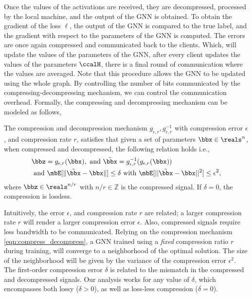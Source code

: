 \documentclass[lettersize,journal]{IEEEtran}
\begin{document}
Once the values of the activations are received, they are decompressed, processed by the local machine, and the output of the GNN is obtained. To obtain the gradient of the loss $\ell$, the output of the GNN is compared to the true label, and the gradient with respect to the parameters of the GNN is computed. The errors are once again compressed and communicated back to the clients. Which, will update the values of the parameters of the GNN, after every client updates the values of the parameters $\ccalH$, there is a final round of communication where the values are averaged. Note that this procedure allows the GNN to be updated using the whole graph. By controlling the number of bits communicated by the compressing-decompressing mechanism, we can control the communication overhead. Formally, the compressing and decompressing mechanism can be modeled as follows,
\begin{definition}\label{def:CompressionDecompression}
	The compression and decompression mechanism $g_{\epsilon,r},g_{\epsilon,r}^{-1}$ with compression error $\epsilon$, and compression rate $r$,  satisfies that given a set of parameters $\bbx\in\reals^n$, when compressed and decompressed, the following relation holds i.e.,
	\begin{align}\label{eqn:compress_decompress}
		&\bbz= g_{\epsilon,r} (\bbx), \text{ and }\tilde \bbx = g_{\epsilon,r}^{-1}(g_{\epsilon,r}( \bbx))\nonumber \\
  &\text{ and }\mbE[\|\tilde \bbx - \bbx\|]\leq \delta \text{ with }\mbE[||\tilde \bbx - \bbx||^2]\leq\epsilon^2,
	\end{align}
	where $\bbz\in \reals^{n/r}$ with $n/r\in\mathbb{Z}$ is the compressed signal. If $\delta=0$, the compression is lossless. 
\end{definition}
% 
Intuitively, the error $\epsilon$, and compression rate $r$ are related; a larger compression rate $r$ will render a larger compression error $\epsilon$. Also, compressed signals require less bandwidth to be communicated. 
Relying on the compression mechanism \eqref{eqn:compress_decompress}, a GNN trained using a \textit{fixed} compression ratio $r$ during training, will converge to a neighborhood of the optimal solution. The size of the neighborhood will be given by the variance of the compression error $\epsilon^2$. The first-order compression error $\delta$ is related to the mismatch in the compressed and decompressed signals. Our analysis works for any value of $\delta$, which encompasses both lossy ($\delta>0$), as well as loss-less compression ($\delta=0$).
\end{document}
